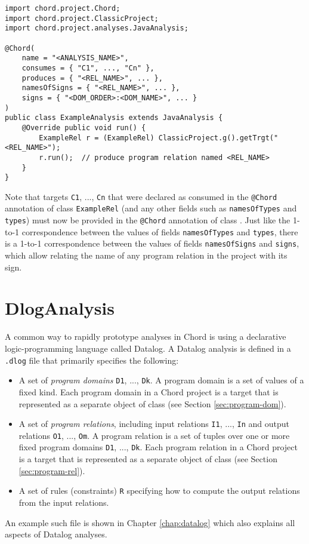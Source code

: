 \begin{framed}
\begin{verbatim}
import chord.project.Chord;
import chord.project.ClassicProject;
import chord.project.analyses.JavaAnalysis;

@Chord(
    name = "<ANALYSIS_NAME>",
    consumes = { "C1", ..., "Cn" },
    produces = { "<REL_NAME>", ... },
    namesOfSigns = { "<REL_NAME>", ... },
    signs = { "<DOM_ORDER>:<DOM_NAME>", ... }
)
public class ExampleAnalysis extends JavaAnalysis {
    @Override public void run() {
        ExampleRel r = (ExampleRel) ClassicProject.g().getTrgt("<REL_NAME>");
        r.run();  // produce program relation named <REL_NAME>
    }
}
\end{verbatim}
\end{framed}

Note that targets {\tt C1}, ..., {\tt Cn} that were declared as consumed in
the {\tt @Chord} annotation of class {\tt ExampleRel} (and any other fields
such as {\tt namesOfTypes} and {\tt types}) must now be provided in the
{\tt @Chord} annotation of class .  Just like the
1-to-1 correspondence between the values of fields {\tt namesOfTypes} and
{\tt types}, there is a 1-to-1 correspondence between the values of fields
{\tt namesOfSigns} and {\tt signs}, which allow relating the name of any program
relation in the project with its sign.

\section{DlogAnalysis}
\label{sec:dlog}

A common way to rapidly prototype analyses in Chord is using a declarative
logic-programming language called Datalog.  A Datalog analysis is defined in a
{\tt .dlog} file that primarily specifies the following:
\begin{itemize}
\item
A set of {\it program domains} {\tt D1}, ..., {\tt Dk}.  A program domain is a
set of values of a fixed kind.  Each program domain in a Chord project is
a target that is represented as a separate object of class 
(see Section \ref{sec:program-dom}).
\item
A set of {\it program relations}, including input relations {\tt I1}, ..., {\tt In}
and output relations {\tt O1}, ..., {\tt Om}.  A program relation is a set of
tuples over one or more fixed program domains {\tt D1}, ..., {\tt Dk}.  Each program
relation in a Chord project is a target that is represented as a separate object
of class  (see Section \ref{sec:program-rel}).
\item
A set of rules (constraints) {\tt R} specifying how to compute the output
relations from the input relations.
\end{itemize}
An example such file is shown in Chapter \ref{chap:datalog} which also
explains all aspects of Datalog analyses.

